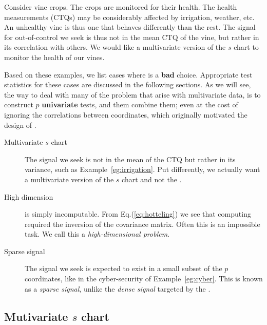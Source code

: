 \begin{example}
\label{eg:irrigation}
Consider vine crops.
The crops are monitored for their health.
The health measurements (CTQs) may be considerably affected by irrigation, weather, etc.
An unhealthy vine is thus one that behaves differently than the rest. 
The signal for out-of-control we seek is thus not in the mean CTQ of the vine, but rather in its correlation with others. 
We would like a multivariate version of the $s$ chart to monitor the health of our vines.  
\end{example}


Based on these examples, we list cases where \tsq is a \textbf{bad} choice. 
Appropriate test statistics for these cases are discussed in the following sections.
As we will see, the way to deal with many of the problem that arise with multivariate data, is to construct $p$ \textbf{univariate} tests, and them combine them; even at the cost of ignoring the correlations between coordinates, which originally motivated the design of \tsq. 
\begin{description}

\item [Multivariate $s$ chart] The signal we seek is not in the mean of the CTQ but rather in its variance, such as Example~\ref{eg:irrigation}. Put differently, we actually want a multivariate version of the $s$ chart and not the \barxChart. 

\item [High dimension] \tsq is simply incomputable. From Eq.(\ref{eq:hotteling}) we see that computing \tsq required the inversion of the covariance matrix. Often this is an impossible task. We call this a \emph{high-dimensional problem}.

\item [Sparse signal] The signal we seek is expected to exist in a small subset of the $p$ coordinates, like in the cyber-security of Example~\ref{eg:cyber}. This is known as a \emph{sparse signal}, unlike the \emph{dense signal} targeted by the \tsq. 

\end{description}




\subsection{Mutivariate $s$ chart}
\label{sec:multivarite_s}

